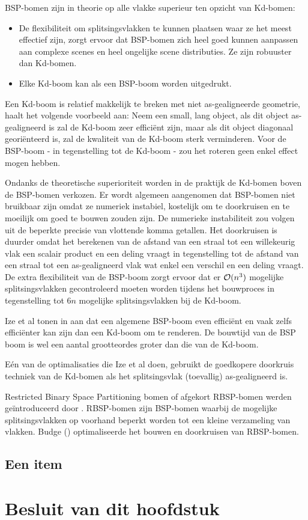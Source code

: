 BSP-bomen zijn in theorie op alle vlakke superieur ten opzicht van Kd-bomen:
\begin{itemize}
	\item De flexibiliteit om splitsingsvlakken te kunnen plaatsen waar ze het meest effectief zijn, zorgt ervoor dat BSP-bomen zich heel goed kunnen aanpassen aan complexe scenes en heel ongelijke scene distributies. Ze zijn robuuster dan Kd-bomen.
	\item Elke Kd-boom kan als een BSP-boom worden uitgedrukt.
\end{itemize}
Een Kd-boom is relatief makkelijk te breken met niet as-gealigneerde geometrie, \cite{Ize} haalt het volgende voorbeeld aan: Neem een small, lang object, als dit object as-gealigneerd is zal de Kd-boom zeer efficiënt zijn, maar als dit object diagonaal georiënteerd is, zal de kwaliteit van de Kd-boom sterk verminderen.
Voor de BSP-boom - in tegenstelling tot de Kd-boom - zou het roteren geen enkel effect mogen hebben.

Ondanks de theoretische superioriteit worden in de praktijk de Kd-bomen boven de BSP-bomen verkozen.
Er wordt algemeen aangenomen dat BSP-bomen niet bruikbaar zijn omdat ze numeriek instabiel, kostelijk om te doorkruisen en te moeilijk om goed te bouwen zouden zijn.
De numerieke instabiliteit zou volgen uit de beperkte precisie van vlottende komma getallen.  
Het doorkruisen is duurder omdat het berekenen van de afstand van een straal tot een willekeurig vlak een scalair product en een deling vraagt in tegenstelling tot de afstand van een straal tot een as-gealigneerd vlak wat enkel een verschil en een deling vraagt.
De extra flexibiliteit van de BSP-boom zorgt ervoor dat er $\mathcal{O}(n^3)$ mogelijke splitsingsvlakken gecontroleerd moeten worden tijdens het bouwproces in tegenstelling tot $6n$ mogelijke splitsingsvlakken bij de Kd-boom.

Ize et al tonen in \cite{Ize} aan dat een algemene BSP-boom even efficiënt en vaak zelfs efficiënter kan zijn dan een Kd-boom om te renderen.
De bouwtijd van de BSP boom is wel een aantal grootteordes groter dan die van de Kd-boom. 

Eén van de optimalisaties die Ize et al doen, gebruikt de goedkopere doorkruis techniek van de Kd-bomen als het splitsingsvlak (toevallig) as-gealigneerd is. 

Restricted Binary Space Partitioning bomen of afgekort RBSP-bomen werden geïntroduceerd door \cite{Kammaje}.
RBSP-bomen zijn BSP-bomen waarbij de mogelijke splitsingsvlakken op voorhand beperkt worden tot een kleine verzameling van vlakken. 
Budge (\cite{Budge}) optimaliseerde het bouwen en doorkruisen van RBSP-bomen.

\subsection{Een item}

\section{Besluit van dit hoofdstuk}
